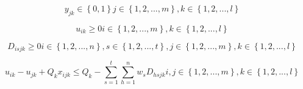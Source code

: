 \documentclass[12pt, a4paper, onecolumn, twoside,french,cleardoublepage=plain,openany]{article}
\begin{document}
\begin{equation}
y_{jk} \in\left\{0,1\right\}   j\in\left\{1,2,...,m\right\}, k\in\left\{1,2,...,l\right\}
\end{equation}

\begin{equation}
u_{ik} \geq 0   i\in\left\{1,2,...,m\right\}, k\in\left\{1,2,...,l\right\}
\end{equation}

\begin{equation}
D_{isjk} \geq 0   i\in\left\{1,2,...,n\right\}, s\in\left\{1,2,...,t\right\}, j\in\left\{1,2,...,m\right\}, k\in\left\{1,2,...,l\right\}
\end{equation}



\begin{equation}
u_{ik} - u_{jk} + Q_{k}x_{ijk} \leq Q_{k} - \sum_{s=1}^{t}\sum_{h=1}^{n}w_{s}D_{hsjk}   i,j\in\left\{1,2,...,m\right\}, k\in\left\{1,2,...,l\right\}
\end{equation}
\end{document}
